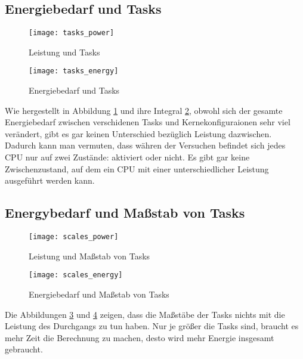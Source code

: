 \subsection{Energiebedarf und Tasks}
\label{subsec:Energiebedarf und Tasks}

\begin{figure}[ht]
\texttt{[image: tasks\_power]}
\caption[Leistung und Tasks]{Leistung und Tasks}
\label{fig:Leistung und Tasks}
\end{figure}

\begin{figure}[ht]
\texttt{[image: tasks\_energy]}
\caption[Energiebedarf und Tasks]{Energiebedarf und Tasks}
\label{fig:Energiebedarf und Tasks}
\end{figure}

Wie hergestellt in Abbildung \ref{fig:Leistung und Tasks} und ihre Integral \ref{fig:Energiebedarf und Tasks}, obwohl sich der gesamte Energiebedarf zwischen verschidenen Tasks und Kernekonfiguraionen sehr viel verändert, gibt es gar keinen Unterschied bezüglich Leistung dazwischen. Dadurch kann man vermuten, dass währen der Versuchen befindet sich jedes CPU nur auf zwei Zustände: aktiviert oder nicht. Es gibt gar keine Zwischenzustand, auf dem ein CPU mit einer unterschiedlicher Leistung ausgeführt werden kann.

\subsection{Energybedarf und Maßstab von Tasks}
\label{subsec:Energybedarf und Massstab von Tasks}

\begin{figure}[ht]
\texttt{[image: scales\_power]}
\caption[Leistung und Maßstab von Tasks]{Leistung und Maßstab von Tasks}
\label{fig:Leistung und Massstab von Tasks}
\end{figure}

\begin{figure}[ht]
\texttt{[image: scales\_energy]}
\caption[Energiebedarf und Maßstab von Tasks]{Energiebedarf und Maßstab von Tasks}
\label{fig:Energiebedarf und Massstab von Tasks}
\end{figure}

Die Abbildungen \ref{fig:Leistung und Massstab von Tasks} und \ref{fig:Energiebedarf und Massstab von Tasks} zeigen, dass die Maßstäbe der Tasks nichts mit die Leistung des Durchgangs zu tun haben. Nur je größer die Tasks sind, braucht es mehr Zeit die Berechnung zu machen, desto wird mehr Energie insgesamt gebraucht.

